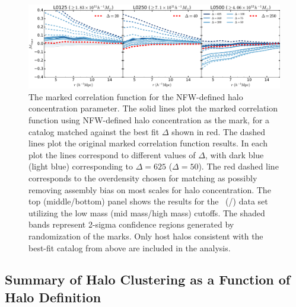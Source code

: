 \documentclass[usenatbib,fleqn]{mnras}
\begin{document}
\begin{figure}
	\centering
	\includegraphics[width=\textwidth]{match_mcf_cNFW.pdf}
	\caption{The marked correlation function for the NFW-defined halo concentration parameter. The solid lines plot the marked correlation function using NFW-defined halo concentration as the mark, for a catalog matched against the best fit $\Delta$ shown in red. The dashed lines plot the original marked correlation function results. In each plot the lines correspond to different values of $\Delta$, with dark blue (light blue) corresponding to $\Delta = 625$ ($\Delta = 50$). The red dashed line corresponds to the overdensity chosen for matching as possibly removing assembly bias on most scales for halo concentration. The top (middle/bottom) panel shows the results for the
\simA \ (\simB /\simC) data set utilizing the low mass (mid mass/high mass) cutoffs. The shaded bands represent 2-sigma confidence regions generated by randomization of the marks. Only host halos consistent with the best-fit catalog from above are included in the analysis.}
	\label{fig:hvm_mcf_cnfw}
\end{figure}


\subsection{Summary of Halo Clustering as a Function of Halo Definition}
\end{document}
